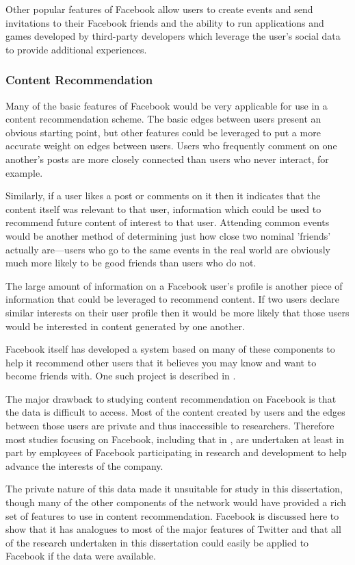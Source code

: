 Other popular features of Facebook allow users to create events and send invitations to their Facebook friends and the ability to run applications and games developed by third-party developers which leverage the user's social data to provide additional experiences.

\subsubsection{Content Recommendation}
\label{sec:FbContentRec}

Many of the basic features of Facebook would be very applicable for use in a content recommendation scheme. The basic edges between users present an obvious starting point, but other features could be leveraged to put a more accurate weight on edges between users. Users who frequently comment on one another's posts are more closely connected than users who never interact, for example.

Similarly, if a user likes a post or comments on it then it indicates that the content itself was relevant to that user, information which could be used to recommend future content of interest to that user. Attending common events would be another method of determining just how close two nominal 'friends' actually are---users who go to the same events in the real world are obviously much more likely to be good friends than users who do not.

The large amount of information on a Facebook user's profile is another piece of information that could be leveraged to recommend content. If two users declare similar interests on their user profile then it would be more likely that those users would be interested in content generated by one another.

Facebook itself has developed a system based on many of these components to help it recommend other users that it believes you may know and want to become friends with. One such project is described in \cite{Backstrom2010}.

The major drawback to studying content recommendation on Facebook is that the data is difficult to access. Most of the content created by users and the edges between those users are private and thus inaccessible to researchers. Therefore most studies focusing on Facebook, including that in \cite{Backstrom2010}, are undertaken at least in part by employees of Facebook participating in research and development to help advance the interests of the company.

The private nature of this data made it unsuitable for study in this dissertation, though many of the other components of the network would have provided a rich set of features to use in content recommendation. Facebook is discussed here to show that it has analogues to most of the major features of Twitter and that all of the research undertaken in this dissertation could easily be applied to Facebook if the data were available.

